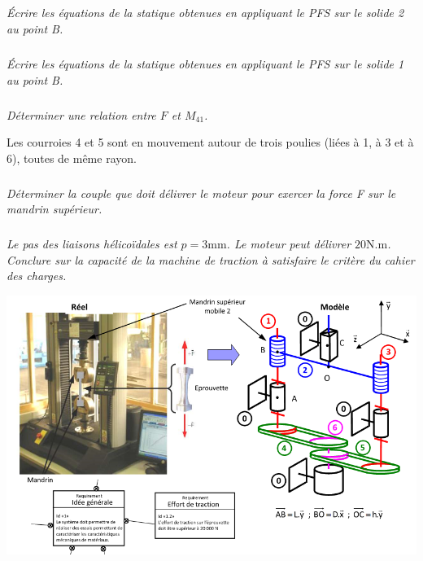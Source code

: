 \documentclass[10pt,fleqn]{article} %
\begin{document}
\begin{multicols}{2}
\subparagraph{}
\textit{Écrire les équations de la statique obtenues en appliquant le PFS sur le solide 2 au point B.}

\subparagraph{}
\textit{Écrire les équations de la statique obtenues en appliquant le PFS sur le solide 1 au point B. }


\subparagraph{}
\textit{Déterminer une relation entre $F$ et $M_{41}$.}

Les courroies 4 et 5 sont en mouvement autour de trois poulies (liées à 1, à 3 et à 6), toutes de même rayon. 

\subparagraph{}
\textit{Déterminer la couple que doit délivrer le moteur pour exercer la force F sur le mandrin supérieur. }


\subparagraph{}
\textit{Le pas des liaisons hélicoïdales est $p = 3 \text{mm}$. Le moteur peut délivrer $20 \text{N.m}$. Conclure sur la capacité de la machine de traction à satisfaire le critère du cahier des charges. }



\end{multicols}


\begin{center}
\includegraphics[width=\linewidth]{images/traction}
\end{center}
\end{document}
